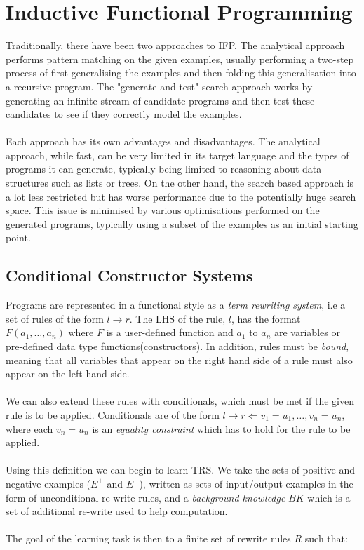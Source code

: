 \section{Inductive Functional Programming}

Traditionally, there have been two approaches to IFP. The analytical approach performs pattern matching on the given examples, usually performing a two-step process of first generalising the examples and then folding this generalisation into a recursive program. The "generate and test" search approach works by generating an infinite stream of candidate programs and then test these candidates to see if they correctly model the examples. \\ \\
Each approach has its own advantages and disadvantages. The analytical approach, while fast, can be very limited in its target language and the types of programs it can generate, typically being limited to reasoning about data structures such as lists or trees. On the other hand, the search based approach is a lot less restricted but has worse performance due to the potentially huge search space. This issue is minimised by various optimisations performed on the generated programs, typically using a subset of the examples as an initial starting point.

\subsection{Conditional Constructor Systems}

Programs are represented in a functional style as a \textit{term rewriting system}, i.e a set of rules of the form $l \rightarrow r$. The LHS of the rule, $l$, has the format $F(a_1, \dots, a_n)$ where $F$ is a user-defined function and $a_1$ to $a_n$ are variables or pre-defined data type functions(constructors). In addition, rules must be \textit{bound}, meaning that all variables that appear on the right hand side of a rule must also appear on the left hand side.\\ \\
We can also extend these rules with conditionals, which must be met if the given rule is to be applied. Conditionals are of the form $l \rightarrow r \Leftarrow v_1 = u_1, \dots, v_n = u_n$, where each $v_n = u_n$ is an \textit{equality constraint} which has to hold for the rule to be applied. \\ \\
Using this definition we can begin to learn TRS. We take the sets of positive and negative examples ($E^+$ and $E^-$), written as sets of input/output examples in the form of unconditional re-write rules, and a \textit{background knowledge} $BK$ which is a set of additional re-write used to help computation. \\ \\
The goal of the learning task is then to a finite set of rewrite rules $R$ such that:

